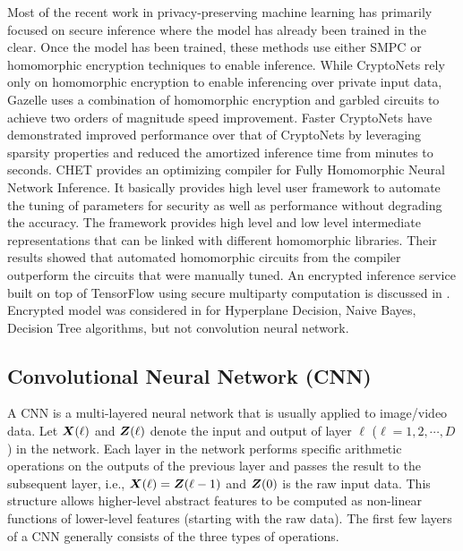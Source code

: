 \documentclass[letterpaper]{article} %
\newcommand{\vect}[1]{\mbox{\boldmath$#1$}}
\begin{document}
Most of the recent work in privacy-preserving machine learning \cite{gilad2016cryptonets}\cite{juvekar2018gazelle}
\cite{fastercryptonets}\cite{dathathri2019chet} has primarily focused on
secure inference where the model has already been trained in the clear.
Once the model has been trained, these methods use either SMPC or homomorphic encryption techniques to enable inference. While CryptoNets \cite{gilad2016cryptonets} rely only on homomorphic encryption to enable inferencing over private input data, Gazelle \cite{juvekar2018gazelle} uses a combination of homomorphic encryption and garbled circuits to achieve  two orders of magnitude speed improvement. Faster CryptoNets \cite{fastercryptonets} have demonstrated improved performance over that of  CryptoNets by leveraging sparsity properties and reduced the amortized inference time from minutes to seconds. CHET \cite{dathathri2019chet} provides an optimizing compiler for Fully Homomorphic Neural Network Inference. It basically provides high level user framework to automate the tuning of parameters for security as well as performance without degrading the accuracy. The framework provides high level and low level intermediate representations that can be linked with different homomorphic libraries. Their results showed that  automated homomorphic circuits from the compiler outperform the circuits that were manually tuned. An encrypted inference service built on top of TensorFlow using secure multiparty computation is discussed in \cite{ppmltensorflow}. Encrypted model was considered in \cite{encryptedmodelinproceedings} for Hyperplane Decision, Naive Bayes, Decision Tree algorithms, but not convolution neural network.

\subsection {Convolutional Neural Network (CNN)}

A CNN is a multi-layered neural network that is usually applied to image/video data. Let $\vect{X}(\ell)$ and $\vect{Z}(\ell)$ denote the input and output of layer $\ell$  ($\ell = 1, 2, \cdots,D$) in the network. Each layer in the network performs specific arithmetic operations on the outputs of the previous layer and passes the result to the subsequent layer, i.e., $\vect{X}(\ell) = \vect{Z}(\ell-1)$ and $\vect{Z}(0)$ is the raw input data. This structure allows higher-level abstract features to be computed as non-linear functions of lower-level features (starting with the raw data). The first few layers of a CNN generally consists of the three types of operations.
\end{document}
